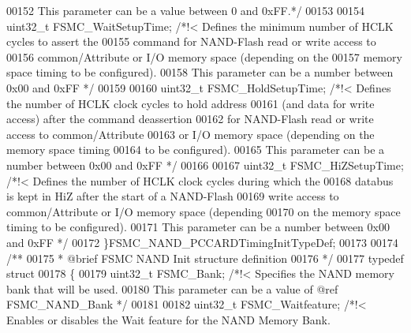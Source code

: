 \begin{DoxyCode}
00152 \textcolor{comment}{                                     This parameter can be a value between 0 and 0xFF.*/}
00153 
00154   uint32\_t FSMC_WaitSetupTime;  \textcolor{comment}{/*!< Defines the minimum number of HCLK cycles to assert the}
00155 \textcolor{comment}{                                     command for NAND-Flash read or write access to}
00156 \textcolor{comment}{                                     common/Attribute or I/O memory space (depending on the}
00157 \textcolor{comment}{                                     memory space timing to be configured). }
00158 \textcolor{comment}{                                     This parameter can be a number between 0x00 and 0xFF */}
00159 
00160   uint32\_t FSMC_HoldSetupTime;  \textcolor{comment}{/*!< Defines the number of HCLK clock cycles to hold address}
00161 \textcolor{comment}{                                     (and data for write access) after the command deassertion}
00162 \textcolor{comment}{                                     for NAND-Flash read or write access to common/Attribute}
00163 \textcolor{comment}{                                     or I/O memory space (depending on the memory space timing}
00164 \textcolor{comment}{                                     to be configured).}
00165 \textcolor{comment}{                                     This parameter can be a number between 0x00 and 0xFF */}
00166 
00167   uint32\_t FSMC_HiZSetupTime;   \textcolor{comment}{/*!< Defines the number of HCLK clock cycles during which the}
00168 \textcolor{comment}{                                     databus is kept in HiZ after the start of a NAND-Flash}
00169 \textcolor{comment}{                                     write access to common/Attribute or I/O memory space (depending}
00170 \textcolor{comment}{                                     on the memory space timing to be configured).}
00171 \textcolor{comment}{                                     This parameter can be a number between 0x00 and 0xFF */}
00172 \}FSMC\_NAND\_PCCARDTimingInitTypeDef;
00173 
00174 \textcolor{comment}{/** }
00175 \textcolor{comment}{  * @brief  FSMC NAND Init structure definition}
00176 \textcolor{comment}{  */}
00177 \textcolor{keyword}{typedef} \textcolor{keyword}{struct}
00178 \{
00179   uint32\_t FSMC_Bank;              \textcolor{comment}{/*!< Specifies the NAND memory bank that will be used.}
00180 \textcolor{comment}{                                      This parameter can be a value of @ref FSMC\_NAND\_Bank */}
00181 
00182   uint32\_t FSMC_Waitfeature;      \textcolor{comment}{/*!< Enables or disables the Wait feature for the NAND Memory Bank.}

\end{DoxyCode}
